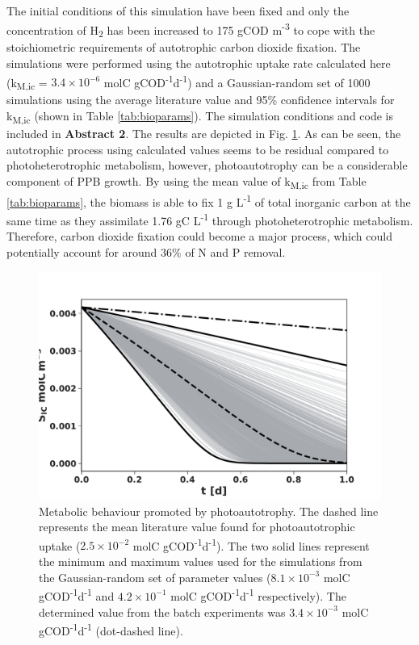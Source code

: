 The initial conditions of this simulation have been fixed and only the concentration of H\textsubscript{2} has been increased to 175 gCOD m\textsuperscript{-3} to cope with the stoichiometric requirements of autotrophic carbon dioxide fixation. The simulations were performed using the autotrophic uptake rate calculated here (k\textsubscript{M,ic} = $\mathrm{3.4\times10^{-6}}$ molC gCOD\textsuperscript{-1}d\textsuperscript{-1}) and a Gaussian-random set of 1000 simulations using the average literature value and 95\% confidence intervals for k\textsubscript{M,ic} (shown in Table \ref{tab:bioparams}). The simulation conditions and code is included in \textbf{Abstract 2}. The results are depicted in Fig. \ref{fig:ch2_auto}. As can be seen, the autotrophic process using calculated values seems to be residual compared to photoheterotrophic metabolism, however, photoautotrophy can be a considerable component of PPB growth. By using the mean value of k\textsubscript{M,ic} from Table \ref{tab:bioparams}, the biomass is able to fix 1 g L\textsuperscript{-1} of total inorganic carbon at the same time as they assimilate 1.76 gC L\textsuperscript{-1} through photoheterotrophic metabolism. Therefore, carbon dioxide fixation  could become a major process, which could potentially account for around 36\% of N and P removal. 


\begin{figure}[tp]
    \centering
    \includegraphics[width=1\linewidth]{./Chap2/simulations/ch2_auto.pdf}
    \caption{Metabolic behaviour promoted by photoautotrophy. The dashed line represents the mean literature value found for photoautotrophic uptake ($\mathrm{2.5 \times 10^{-2}}$ molC gCOD\textsuperscript{-1}d\textsuperscript{-1}). The two solid lines represent the minimum and maximum values used for the simulations from the Gaussian-random set of parameter values ($\mathrm{8.1 \times 10^{-3}}$ molC gCOD\textsuperscript{-1}d\textsuperscript{-1} and $\mathrm{4.2 \times 10^{-1}}$ molC gCOD\textsuperscript{-1}d\textsuperscript{-1} respectively). The determined value from the batch experiments was $\mathrm{3.4 \times 10^{-3}}$ molC gCOD\textsuperscript{-1}d\textsuperscript{-1} (dot-dashed line).}
    \label{fig:ch2_auto}
\end{figure}

